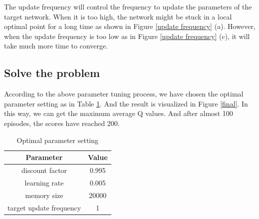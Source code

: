 \documentclass{article}
\begin{document}
The update frequency will control the frequency to update the parameters of the target network.
When it is too high, the network might be stuck in a local optimal point for a long time as shown in
Figure \ref{update frequency} (a). However, when the update frequency is too low as in Figure \ref{update frequency}
(c), it will take much more time to converge.

\subsection{Solve the problem}

According to the above parameter tuning process, we have chosen the optimal parameter setting as in
Table \ref{param table}. And the result is visualized in Figure \ref{final}. In this way, we can get
the maximum average Q values. And after almost 100 episodes, the scores have reached 200.

\begin{table}[H]
  \centering
  \begin{tabular}{cc}
  \hline\hline
  Parameter& Value\\
  \hline\hline
  discount factor & 0.995\\
  learning rate & 0.005\\
  memory size & 20000\\
  target update frequency & 1\\
  \hline
  \end{tabular}
  \caption{Optimal parameter setting}
  \label{param table}
\end{table}
\end{document}
